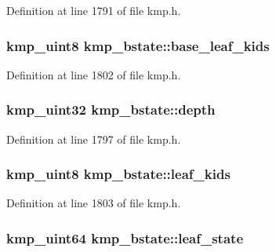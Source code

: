 Definition at line 1791 of file kmp.\-h.

\hypertarget{structkmp__bstate_af4b300647701635112333890bd276a5d}{
\subsubsection[{base\-\_\-leaf\-\_\-kids}]{\setlength{\rightskip}{0pt plus 5cm}kmp\-\_\-uint8 kmp\-\_\-bstate\-::base\-\_\-leaf\-\_\-kids}}\label{structkmp__bstate_af4b300647701635112333890bd276a5d}


Definition at line 1802 of file kmp.\-h.

\hypertarget{structkmp__bstate_aeee2bd7ab328429c59216e3e003a9750}{
\subsubsection[{depth}]{\setlength{\rightskip}{0pt plus 5cm}kmp\-\_\-uint32 kmp\-\_\-bstate\-::depth}}\label{structkmp__bstate_aeee2bd7ab328429c59216e3e003a9750}


Definition at line 1797 of file kmp.\-h.

\hypertarget{structkmp__bstate_a39d8977f4bd79dbfae45fb58f1fc22fe}{
\subsubsection[{leaf\-\_\-kids}]{\setlength{\rightskip}{0pt plus 5cm}kmp\-\_\-uint8 kmp\-\_\-bstate\-::leaf\-\_\-kids}}\label{structkmp__bstate_a39d8977f4bd79dbfae45fb58f1fc22fe}


Definition at line 1803 of file kmp.\-h.

\hypertarget{structkmp__bstate_a937413b859e80adbc07973d4e2a428db}{
\subsubsection[{leaf\-\_\-state}]{\setlength{\rightskip}{0pt plus 5cm}kmp\-\_\-uint64 kmp\-\_\-bstate\-::leaf\-\_\-state}}\label{structkmp__bstate_a937413b859e80adbc07973d4e2a428db}


